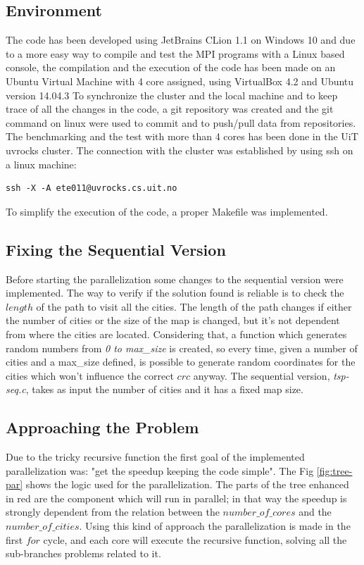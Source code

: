 \documentclass[11pt,conference]{IEEEtran}
\begin{document}
\subsection{Environment}
The code has been developed using JetBrains CLion 1.1 on Windows 10 and due to a more easy way to compile and test the MPI programs with a Linux based console, the compilation and the execution of the code has been made on an Ubuntu Virtual Machine with 4 core assigned, using VirtualBox 4.2 and Ubuntu version 14.04.3
\newline
To synchronize the cluster and the local machine and to keep trace of all the changes in the code, a git repository was created and the git command on linux were used to commit and to push/pull data from repositories.
\newline
The benchmarking and the test with more than 4 cores has been done in the UiT uvrocks cluster. The connection with the cluster was established by using ssh on a linux machine:
\begin{lstlisting}
ssh -X -A ete011@uvrocks.cs.uit.no
\end{lstlisting}
To simplify the execution of the code, a proper Makefile was implemented.

\subsection{Fixing the Sequential Version}
Before starting the parallelization some changes to the sequential version were implemented. The way to verify if the solution found is reliable is to check the $length$ of the path to visit all the cities. The length of the path changes if either the number of cities or the size of the map is changed, but it's not dependent from where the cities are located. Considering that, a function which generates random numbers from \textit{0 to max\_size} is created, so every time, given a number of cities and a max\_size defined, is possible to generate random coordinates for the cities which won't influence the correct $crc$ anyway.
The sequential version, \textit{tsp-seq.c}, takes as input the number of cities and it has a fixed map size.

\subsection{Approaching the Problem}
Due to the tricky recursive function the first goal of the implemented parallelization was: "get the speedup keeping the code simple". 
The Fig \ref{fig:tree-par} shows the logic used for the parallelization. The parts of the tree enhanced in red are the component which will run in parallel; in that way the speedup is strongly dependent from the relation between the $number\_of\_cores$ and the $number\_of\_cities$. Using this kind of approach the parallelization is made in the first $for$ cycle, and each core will execute the recursive function, solving all the sub-branches problems related to it.
\end{document}
